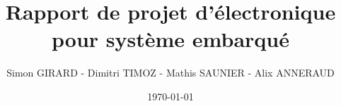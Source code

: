 \documentclass[a4paper, 12pt]{report}
\title{Rapport de projet d'électronique pour système embarqué}
\author{Simon GIRARD - Dimitri TIMOZ - Mathis SAUNIER - Alix ANNERAUD}
\date{\today}
\begin{document}


\tableofcontents

\newcommand{\todo}{\begin{center}\Huge A faire\normalsize \end{center}} %












\end{document}
